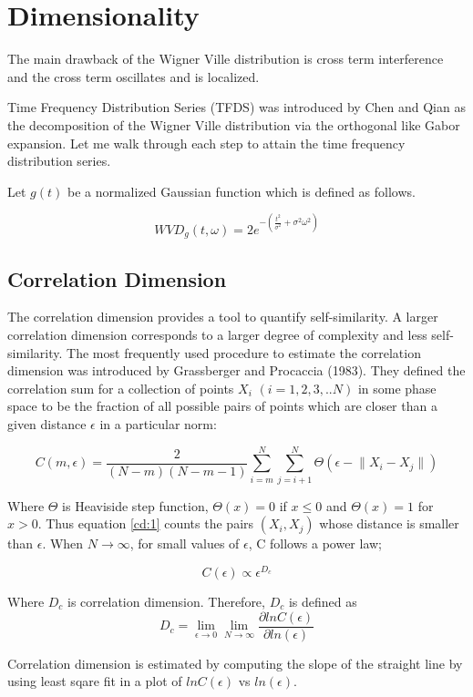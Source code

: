 \section{Dimensionality}

The main drawback of the Wigner Ville distribution is cross term interference and the cross term oscillates and is localized. 

Time Frequency Distribution Series (TFDS) was introduced by Chen and Qian \cite{pchen} as the decomposition of the Wigner Ville distribution via the orthogonal like Gabor expansion. Let me walk through each step to attain the time frequency distribution series. 

Let $g(t)$ be a normalized Gaussian function which is defined as follows. 

\begin{equation}
WVD_g(t,\omega) = 2 e^{-(\frac{t^2}{\sigma^2}+\sigma^2\omega^2)}
\end{equation}

\subsection{Correlation Dimension}
The correlation dimension provides a tool to quantify self-similarity. A larger correlation dimension corresponds to a larger degree of complexity and less self-similarity. The most frequently used procedure to estimate the correlation dimension was introduced by Grassberger and Procaccia (1983). They defined the correlation sum for a collection of points $X_i$ $(i=1,2,3,..N)$ in some phase space to be the fraction of all possible pairs of points which are closer than a given distance $\epsilon$ in a particular norm:

\begin{equation} \label{cd:1}
C(m,\epsilon) = \frac{2}{(N-m)(N-m-1)} \sum_{i=m}^{N}\sum_{j=i+1}^{N} \Theta (\epsilon - \lVert X_i - X_j \rVert )
\end{equation}

Where $\Theta$ is Heaviside step function, $\Theta(x) = 0$ if $x \le 0 $ and $\Theta(x) = 1$ for $x>0$.
Thus equation \ref{cd:1} counts the pairs $(X_i,X_j)$ whose distance is smaller than $\epsilon$.  When ${N\to\infty}$, for small values of $\epsilon$, C follows a power law;

\begin{equation} \label{cd:2}
C(\epsilon) \propto \epsilon^{D_c}
\end{equation}

Where $D_c$ is correlation dimension. Therefore, $D_c$ is defined as 
\begin{equation} \label{cd:3}
D_c = \lim_{\epsilon\to 0} \lim_{N\to\infty} \frac{\partial ln C(\epsilon)}{\partial ln(\epsilon)}
\end{equation}

Correlation dimension is estimated by computing the slope of the straight line by using least sqare fit in a plot of $ln C(\epsilon)$ vs $ln(\epsilon)$. 
